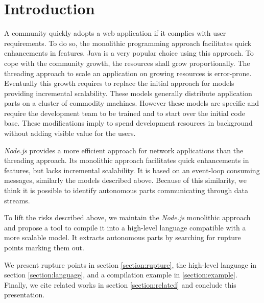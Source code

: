 \section{Introduction}

A community quickly adopts a web application if it complies with user requirements.
To do so, the monolithic programming approach facilitates quick enhancements in features.
Java is a very popular choice using this approach.
To cope with the community growth, the resources shall grow proportionally.
The threading approach to scale an application on growing resources is error-prone.
Eventually this growth requires to replace the initial approach for models providing incremental scalability.
These models generally distribute application parts on a cluster of commodity machines\cite{Fox1997}.
However these models are specific and require the development team to be trained and to start over the initial code base.
These modifications imply to spend development resources in background without adding visible value for the users.

\vfill\eject

\textit{Node.js} provides a more efficient approach for network applications than the threading approach.
Its monolithic approach facilitates quick enhancements in features, but lacks incremental scalability.
It is based on an event-loop consuming messages, similarly the models described above.
Because of this similarity, we think it is possible to identify autonomous parts communicating through data streams.

To lift the risks described above, we maintain the \textit{Node.js} monolithic approach and propose a tool to compile it into a high-level language compatible with a more scalable model.
It extracts autonomous parts by searching for rupture points marking them out.

We present rupture points in section \ref{section:rupture}, the high-level language in section \ref{section:language}, and a compilation example in \ref{section:example}.
Finally, we cite related works in section \ref{section:related} and conclude this presentation.